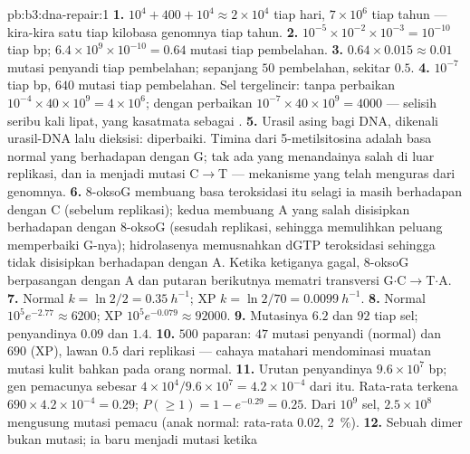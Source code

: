 \begin{solution}{pb:b3:dna-repair:1}
\textbf{1.} $10^{4} + 400 + 10^{4} \approx 2\times 10^{4}$  tiap
hari, $7\times 10^{6}$ tiap tahun --- kira-kira satu tiap kilobasa genomnya
tiap tahun.
\textbf{2.} $10^{-5}\times 10^{-2}\times 10^{-3} = 10^{-10}$ tiap bp;
$6.4\times 10^{9}\times 10^{-10} = 0.64$ mutasi tiap pembelahan.
\textbf{3.} $0.64\times 0.015 \approx 0.01$ mutasi penyandi tiap
pembelahan; sepanjang $50$ pembelahan, sekitar $0.5$.
\textbf{4.} $10^{-7}$ tiap bp, $640$ mutasi tiap pembelahan. Sel
tergelincir: tanpa perbaikan $10^{-4}\times 40\times 10^{9} = 4\times 10^{6}$;
dengan perbaikan $10^{-7}\times 40\times 10^{9} = 4000$ --- selisih seribu
kali lipat, yang kasatmata sebagai .
\textbf{5.} Urasil asing bagi DNA, dikenali  urasil-DNA
lalu dieksisi: diperbaiki. Timina dari 5-metilsitosina adalah
basa normal yang berhadapan dengan G; tak ada yang menandainya salah di luar
replikasi, dan ia menjadi mutasi C$\to$T --- mekanisme yang telah menguras
 dari genomnya.
\textbf{6.}  8-oksoG membuang basa teroksidasi itu selagi ia
masih berhadapan dengan C (sebelum replikasi);  kedua membuang
A yang salah disisipkan berhadapan dengan 8-oksoG (sesudah replikasi, sehingga
memulihkan peluang memperbaiki G-nya); hidrolasenya memusnahkan dGTP
teroksidasi sehingga tidak disisipkan berhadapan dengan A. Ketika ketiganya
gagal, 8-oksoG berpasangan dengan A dan putaran berikutnya mematri
transversi G$\cdot$C$\to$T$\cdot$A.
\textbf{7.} Normal $k = \ln 2/2 = \qty{0.35}{h^{-1}}$; XP $k = \ln 2/70
= \qty{0.0099}{h^{-1}}$.
\textbf{8.} Normal $10^{5} e^{-2.77} \approx 6200$; XP $10^{5}
e^{-0.079} \approx \num{92000}$.
\textbf{9.} Mutasinya $6.2$ dan $92$ tiap sel; penyandinya $0.09$ dan $1.4$.
\textbf{10.} $500$ paparan: $47$ mutasi penyandi (normal) dan $690$
(XP), lawan $0.5$ dari replikasi --- cahaya matahari mendominasi
muatan mutasi kulit bahkan pada orang normal.
\textbf{11.} Urutan penyandinya $9.6\times 10^{7}$ bp; gen pemacunya
sebesar $4\times 10^{4}/9.6\times 10^{7} = 4.2\times 10^{-4}$ dari itu.
Rata-rata terkena $690\times 4.2\times 10^{-4} = 0.29$; $P(\ge 1) = 1 - e^{-0.29} =
0.25$. Dari $10^{9}$ sel, $2.5\times 10^{8}$ mengusung mutasi pemacu
(anak normal: rata-rata $0.02$, \qty{2}{\%}).
\textbf{12.} Sebuah dimer bukan mutasi; ia baru menjadi mutasi ketika

\end{solution}

